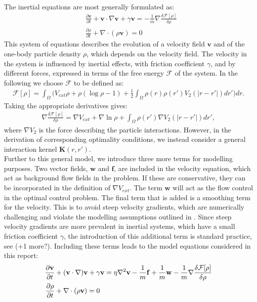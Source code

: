 \documentclass[11pt, a4paper]{article}
\theoremstyle{definition}
\newcommand{\Sta}{\rho}
\newcommand{\Stav}{\mathbf{v}}
\newcommand{\Con}{\mathbf{f}}
\begin{document}
The inertial equations are most generally formulated as:
\begin{align*}
	&\frac{\partial \Stav}{\partial t} + \Stav \cdot \nabla \Stav + \gamma \Stav = - \frac{1}{m} \nabla \frac{\delta \mathcal{F}[\Sta]}{\delta \Sta}\\
	&\frac{\partial \Sta}{\partial t} + \nabla \cdot (\Sta \Stav) =0
\end{align*}
This system of equations describes the evolution of a velocity field $\Stav$ and of the one-body particle density $\Sta$, which depends on the velocity field.
The velocity in the system is influenced by inertial effects, with friction coefficient $\gamma$, and by different forces, expressed in terms of the free energy $\mathcal{F}$ of the system.
In the following we choose $\mathcal{F}$ to be defined as:
\begin{align*}
\mathcal{F}[\Sta]=\int_\Omega  \bigg( V_{ext}\Sta + \Sta (\log \Sta -1) +  \frac{1}{2}\int_\Omega \Sta(r) \Sta(r')V_2(|r-r'|)dr' \bigg) dr.
\end{align*}
Taking the appropriate derivatives gives:
\begin{align*}
 \nabla \frac{\delta \mathcal{F}[\Sta]}{\delta \Sta} = \nabla V_{ext} + \nabla \ln \Sta + \int_\Omega \Sta(r') \nabla V_2(|r-r'|)dr',
\end{align*}
where $\nabla V_2$ is the force describing the particle interactions. However, in the derivation of corresponding optimality conditions, we instead consider a general interaction kernel $\mathbf{K}(r,r')$.
\\
Further to this general model, we introduce three more terms for modelling purposes. Two vector fields, $\mathbf{w}$ and $\Con$, are included in the velocity equation, which act as background flow fields in the problem. If these are conservative, they can be incorporated in the definition of $\nabla V_{ext}$. The term $\mathbf{w}$ will act as the flow control in the optimal control problem.
The final term that is added is a smoothing term for the velocity. This is to avoid steep velocity gradients, which are numerically challenging and violate the modelling assumptions outlined in \cite{Archer1}. Since steep velocity gradients are more prevalent in inertial systems, which have a small friction coefficient $\gamma$, the introduction of this additional term is standard practice, see \cite{Archer1} (+1 more?).
Including these terms leads to the model equations considered in this report:
\begin{align}
\label{eqn:INeqns1}
\frac{\partial \Stav}{\partial t} &+ (\Stav \cdot \nabla)\Stav + \gamma \Stav=\eta \nabla^2 \Stav  -\frac{1}{m}\Con +\frac{1}{m}\mathbf{w} - \frac{1}{m}\nabla \frac{\delta \mathcal{F}[\Sta]}{\delta \Sta}\\
\frac{\partial \Sta}{\partial t} &+ \nabla \cdot (\Sta \Stav)=0 \notag
\end{align}
\end{document}
